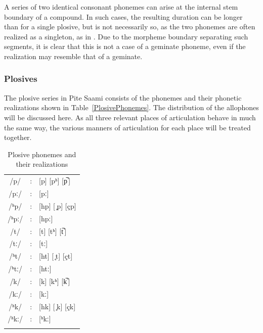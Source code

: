 A series of two identical consonant phonemes can arise at the internal stem boundary of a compound. In such cases, the resulting duration can be longer than for a single plosive, but is not necessarily so, as the two phonemes are often realized as a singleton, as in .
Due to the morpheme boundary separating such segments, it is clear that this is not a case of a geminate phoneme, even if the realization may resemble that of a geminate. 


\subsubsection{Plosives}\label{Plosives}%
The plosive series in Pite Saami consists of the phonemes and their phonetic realizations shown in Table~\vref{PlosivePhonemes}. The distribution of the allophones will be discussed here. As all three relevant places of articulation behave in much the same way, the various manners of articulation for each place will be treated together.
\begin{table}\centering
\caption{Plosive phonemes and their realizations}\label{PlosivePhonemes}
\begin{tabular}{c c l}\mytoprule
/p/ &:& [p] [pʰ] [p̚\,] \\ %
/pː/ &:& [pː] \\ %
/ʰp/ &:& [hp] [ ̥p] [çp]  \\ %
/ʰpː/ &:& [hpː] \\ %
/t/ &:& [t] [tʰ] [t̚\,] \\%
/tː/ &:& [tː] \\
/ʰt/ &:& [ht] [ ̥t] [çt] \\
/ʰtː/ &:& [htː] \\
/k/ &:& [k] [kʰ] [k̚\,] \\
/kː/ &:& [kː] \\
/ʰk/ &:& [hk] [ ̥k] [çk]  \\
/ʰkː/ &:& [ʰkː] \\
\mybottomrule
\end{tabular}
\end{table}


